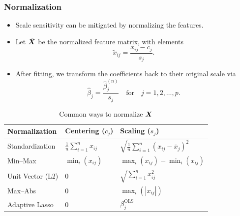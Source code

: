 \documentclass[10pt]{beamer}
\begin{document}
\begin{frame}[c]
  \frametitle{Normalization}

  \begin{itemize}[<+->]
    \item Scale sensitivity can be mitigated by normalizing the features.
    \item Let \(\tilde{\bm{X}}\) be the normalized feature matrix, with elements
          \[
            \tilde{x}_{ij} = \frac{x_{ij} - c_{j}}{s_j}.
          \]
    \item After fitting, we transform the coefficients back to their original scale via
          \[
            \hat\beta_j = \frac{\hat\beta^{(n)}_j}{s_j} \quad\text{for}\quad j = 1,2,\dots,p.
          \]
  \end{itemize}

\end{frame}

\begin{frame}[c]
  \begin{table}[hbt]
    \centering
    \caption{Common ways to normalize \(\bm{X}\)}
    \begin{tabular}{lll}
      \toprule
      Normalization    & Centering (\(c_{j}\))              & Scaling (\(s_j\))                                         \\
      \midrule
      Standardization  & \(\frac{1}{n}\sum_{i=1}^n x_{ij}\) & \(\sqrt{\frac{1}{n}\sum_{i=1}^n (x_{ij} - \bar{x}_j)^2}\) \\
      \addlinespace
      Min--Max         & \(\min_i(x_{ij})\)                 & \(\max_i(x_{ij}) - \min_i(x_{ij})\)                       \\
      \addlinespace
      Unit Vector (L2) & 0                                  & \(\sqrt{\sum_{i=1}^n x_{ij}^2}\)                          \\
      \addlinespace
      Max--Abs         & 0                                  & \(\max_i(|x_{ij}|)\)                                      \\
      \addlinespace
      Adaptive Lasso   & 0                                  & \(\beta_j^\text{OLS}\)                                    \\
      \bottomrule
    \end{tabular}
  \end{table}
\end{frame}
\end{document}
